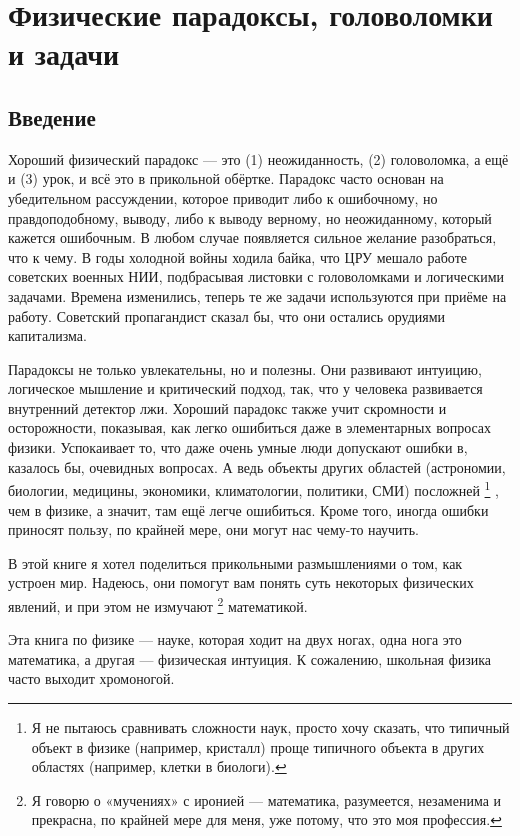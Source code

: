 \chapter[Парадоксы, головоломки, задачи]{Физические парадоксы, головоломки и задачи}

\section{Введение}

Хороший физический парадокс --- это (1) неожиданность, (2) головоломка, а ещё и (3) урок, и всё это в прикольной обёртке.
Парадокс часто основан на убедительном рассуждении, которое приводит либо к ошибочному, но правдоподобному, выводу, либо к выводу верному, но неожиданному, который кажется ошибочным.
В любом случае появляется сильное желание разобраться, что к чему.
В годы холодной войны ходила байка, что ЦРУ мешало работе советских военных НИИ, подбрасывая листовки с головоломками и логическими задачами.
Времена изменились, теперь те же задачи используются при приёме на работу.
Советский пропагандист сказал бы, что они остались орудиями капитализма.

Парадоксы не только увлекательны, но и полезны.
Они развивают интуицию, логическое мышление и критический подход, так, что
у человека развивается внутренний детектор лжи.
Хороший парадокс также учит скромности и осторожности, показывая, как легко ошибиться даже в элементарных вопросах физики.
Успокаивает то, что даже очень умные люди допускают ошибки в, казалось бы, очевидных вопросах.
А ведь объекты других областей (астрономии, биологии, медицины, экономики, климатологии, политики, СМИ) посложней%
\footnote{Я не пытаюсь сравнивать сложности наук, просто хочу сказать, что типичный объект в физике (например, кристалл) проще типичного объекта в других областях (например, клетки в биологи).}%
, чем в физике, а значит, там ещё легче ошибиться.
Кроме того, иногда ошибки приносят пользу, по крайней мере, они могут нас чему-то научить.

В этой книге я хотел поделиться прикольными размышлениями о том, как устроен мир.
Надеюсь, они помогут вам понять суть некоторых физических явлений, и при этом не измучают%
\footnote{Я говорю о «мучениях» с иронией --- математика, разумеется, незаменима и прекрасна, по крайней мере для меня, уже потому, что это моя профессия.}
математикой.

Эта книга по физике --- науке, которая ходит на двух ногах, одна нога это математика, а другая --- физическая интуиция.
К сожалению, школьная физика часто выходит хромоногой.

